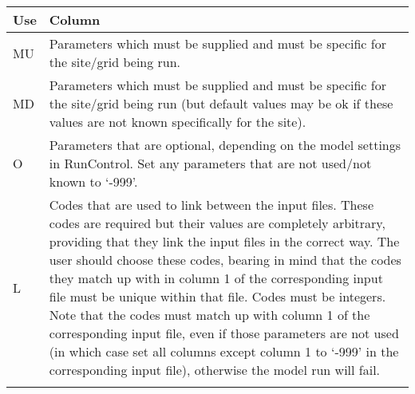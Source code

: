 \documentclass[letterpaper,10pt,english]{sphinxmanual}
\begin{document}
\begin{savenotes}\sphinxattablestart
\centering
\begin{tabulary}{\linewidth}[t]{|T|T|}
\hline
\sphinxstyletheadfamily 
Use
&\sphinxstyletheadfamily 
Column
\\
\hline
MU
&
Parameters which must be supplied
and must be specific for the
site/grid being run.
\\
\hline
MD
&
Parameters which must be supplied
and must be specific for the
site/grid being run (but default
values may be ok if these values
are not known specifically for
the site).
\\
\hline
O
&
Parameters that are optional,
depending on the model settings
in RunControl. Set any parameters
that are not used/not known to
‘-999’.
\\
\hline
L
&
Codes that are used to link
between the input files. These
codes are required but their
values are completely arbitrary,
providing that they link the
input files in the correct way.
The user should choose these
codes, bearing in mind that the
codes they match up with in
column 1 of the corresponding
input file must be unique within
that file. Codes must be
integers. Note that the codes
must match up with column 1 of
the corresponding input file,
even if those parameters are not
used (in which case set all
columns except column 1 to ‘-999’
in the corresponding input file),
otherwise the model run will
fail.
\\
\hline&\\
\hline
\end{tabulary}
\par
\sphinxattableend\end{savenotes}
\end{document}
